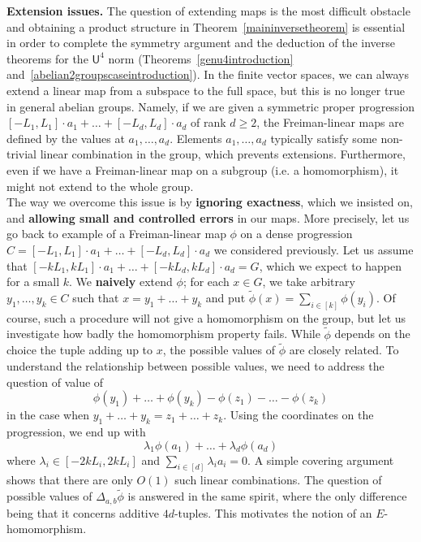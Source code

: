 \documentclass[a4paper,11pt]{article}
\numberwithin{theorem}{section}
\theoremstyle{definition}
\begin{document}
\noindent\textbf{Extension issues.} The question of extending maps is the most difficult obstacle and obtaining a product structure in Theorem~\ref{maininversetheorem} is essential in order to complete the symmetry argument and the deduction of the inverse theorems for the $\mathsf{U}^4$ norm (Theorems~\ref{genu4introduction} and~\ref{abelian2groupscaseintroduction}). In the finite vector spaces, we can always extend a linear map from a subspace to the full space, but this is no longer true in general abelian groups. Namely, if we are given a symmetric proper progression $[-L_1, L_1]\cdot a_1 + \dots + [-L_d, L_d] \cdot a_d$ of rank $d\geq2$, the Freiman-linear maps are defined by the values at $a_1, \dots, a_d$. Elements $a_1, \dots, a_d$ typically satisfy some non-trivial linear combination in the group, which prevents extensions. Furthermore, even if we have a Freiman-linear map on a subgroup (i.e. a homomorphism), it might not extend to the whole group.\\
\indent The way we overcome this issue is by \textbf{ignoring exactness}, which we insisted on, and \textbf{allowing small and controlled errors} in our maps. More precisely, let us go back to example of a Freiman-linear map $\phi$ on a dense progression $C = [-L_1, L_1] \cdot a_1 + \dots + [-L_d, L_d] \cdot a_d$ we considered previously. Let us assume that $[-kL_1, kL_1] \cdot a_1 + \dots + [-kL_d, kL_d] \cdot a_d= G$, which we expect to happen for a small $k$. We \textbf{naively} extend $\phi$; for each $x \in G$, we take arbitrary $y_1, \dots, y_k \in C$ such that $x = y_1 + \dots + y_k$ and put $\tilde{\phi}(x) = \sum_{i \in [k]} \phi(y_i)$. Of course, such a procedure will not give a homomorphism on the group, but let us investigate how badly the homomorphism property fails. While $\tilde{\phi}$ depends on the choice the tuple adding up to $x$, the possible values of $\tilde{\phi}$ are closely related. To understand the relationship between possible values, we need to address the question of value of 
\[\phi(y_1) + \dots + \phi(y_k) - \phi(z_1) - \dots - \phi(z_k)\]
in the case when $y_1 + \dots + y_k = z_1 + \dots + z_k$. Using the coordinates on the progression, we end up with 
\[\lambda_1 \phi(a_1) + \dots + \lambda_d \phi(a_d)\]
where $\lambda_i \in [-2kL_i, 2kL_i]$ and $\sum_{i \in [d]} \lambda_i a_i = 0$. A simple covering argument shows that there are only $O(1)$ such linear combinations. The question of possible values of $\Delta_{a,b}\tilde{\phi}$ is answered in the same spirit, where the only difference being that it concerns additive $4d$-tuples. This motivates the notion of an $E$-homomorphism.
\end{document}
